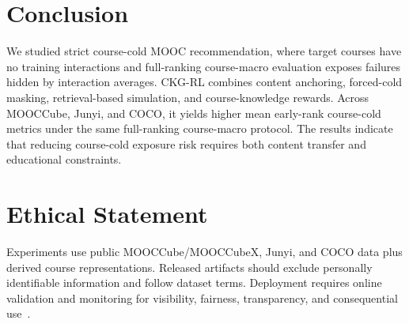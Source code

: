 \documentclass[letterpaper]{article}
\begin{document}
\section{Conclusion}
We studied strict course-cold MOOC recommendation, where target courses have no training interactions and full-ranking course-macro evaluation exposes failures hidden by interaction averages. CKG-RL combines content anchoring, forced-cold masking, retrieval-based simulation, and course-knowledge rewards. Across MOOCCube, Junyi, and COCO, it yields higher mean early-rank course-cold metrics under the same full-ranking course-macro protocol. The results indicate that reducing course-cold exposure risk requires both content transfer and educational constraints.

\section*{Ethical Statement}
Experiments use public MOOCCube/MOOCCubeX, Junyi, and COCO data plus derived course representations. Released artifacts should exclude personally identifiable information and follow dataset terms. Deployment requires online validation and monitoring for visibility, fairness, transparency, and consequential use~\cite{stray2024values,zhao2025fairnessdiversity}.


\end{document}
